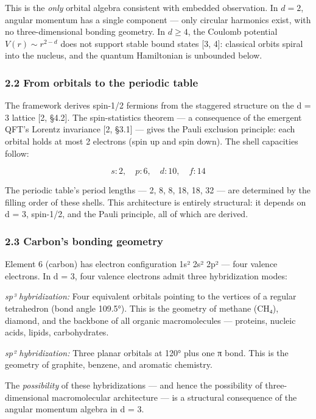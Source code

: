 \documentclass[
]{article}
\begin{document}
This is the \emph{only} orbital algebra consistent with embedded
observation. In \(d = 2\), angular momentum has a single component ---
only circular harmonics exist, with no three-dimensional bonding
geometry. In \(d \geq 4\), the Coulomb potential \(V(r) \sim r^{2-d}\)
does not support stable bound states {[}3, 4{]}: classical orbits spiral
into the nucleus, and the quantum Hamiltonian is unbounded below.

\hypertarget{from-orbitals-to-the-periodic-table}{%
\subsubsection{2.2 From orbitals to the periodic
table}\label{from-orbitals-to-the-periodic-table}}

The framework derives spin-1/2 fermions from the staggered structure on
the d = 3 lattice {[}2, §4.2{]}. The spin-statistics theorem --- a
consequence of the emergent QFT's Lorentz invariance {[}2, §3.1{]} ---
gives the Pauli exclusion principle: each orbital holds at most 2
electrons (spin up and spin down). The shell capacities follow:

\[s: 2, \quad p: 6, \quad d: 10, \quad f: 14\]

The periodic table's period lengths --- 2, 8, 8, 18, 18, 32 --- are
determined by the filling order of these shells. This architecture is
entirely structural: it depends on d = 3, spin-1/2, and the Pauli
principle, all of which are derived.

\hypertarget{carbons-bonding-geometry}{%
\subsubsection{2.3 Carbon's bonding
geometry}\label{carbons-bonding-geometry}}

Element 6 (carbon) has electron configuration 1s² 2s² 2p² --- four
valence electrons. In d = 3, four valence electrons admit three
hybridization modes:

\emph{sp³ hybridization:} Four equivalent orbitals pointing to the
vertices of a regular tetrahedron (bond angle 109.5°). This is the
geometry of methane (CH₄), diamond, and the backbone of all organic
macromolecules --- proteins, nucleic acids, lipids, carbohydrates.

\emph{sp² hybridization:} Three planar orbitals at 120° plus one π bond.
This is the geometry of graphite, benzene, and aromatic chemistry.

The \emph{possibility} of these hybridizations --- and hence the
possibility of three-dimensional macromolecular architecture --- is a
structural consequence of the angular momentum algebra in d = 3.
\end{document}
